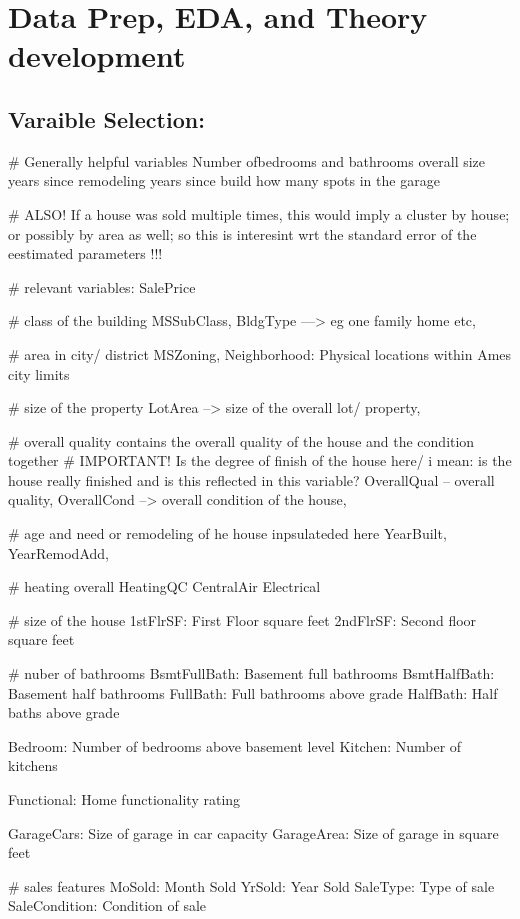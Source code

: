 \documentclass{article}
\begin{document}
\section{Data Prep, EDA, and Theory development}
\subsection{Varaible Selection:}









# Generally helpful variables
Number ofbedrooms and bathrooms
overall size
years since remodeling
years since build 
how many spots in the garage 

# ALSO! If a house was sold multiple times, this would imply a cluster by house; or possibly by area as well; so this is interesint wrt the standard error of the eestimated parameters !!!

# relevant variables:
SalePrice

# class of the building 
MSSubClass,
BldgType ---> eg one family home etc,

# area in city/ district
MSZoning,
Neighborhood: Physical locations within Ames city limits

# size of the property 
LotArea --> size of the overall lot/ property,


# overall quality contains the overall quality of the house and the condition together 
# IMPORTANT! Is the degree of finish of the house here/ i mean: is the house really finished and is this reflected in this variable?
OverallQual -- overall quality,
OverallCond --> overall condition of the house,

# age and need or remodeling of he house inpsulateded here 
YearBuilt,
YearRemodAdd,

# heating overall
HeatingQC
CentralAir
Electrical

# size of the house
1stFlrSF: First Floor square feet
2ndFlrSF: Second floor square feet

# nuber of bathrooms
BsmtFullBath: Basement full bathrooms
BsmtHalfBath: Basement half bathrooms
FullBath: Full bathrooms above grade
HalfBath: Half baths above grade

Bedroom: Number of bedrooms above basement level
Kitchen: Number of kitchens

Functional: Home functionality rating


GarageCars: Size of garage in car capacity
GarageArea: Size of garage in square feet

# sales features
MoSold: Month Sold
YrSold: Year Sold
SaleType: Type of sale
SaleCondition: Condition of sale
\end{document}
